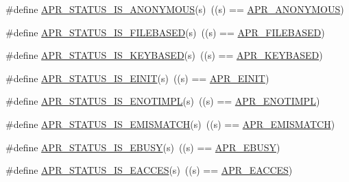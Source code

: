 \begin{DoxyCompactItemize}
\item 
\#define \hyperlink{group___a_p_r___s_t_a_t_u_s___i_s_gabf2969f69ac131cb06178c0809abf943}{A\-P\-R\-\_\-\-S\-T\-A\-T\-U\-S\-\_\-\-I\-S\-\_\-\-A\-N\-O\-N\-Y\-M\-O\-U\-S}(s)~((s) == \hyperlink{group___a_p_r___error_ga738a229b0c27bd96ae0173fecab251b7}{A\-P\-R\-\_\-\-A\-N\-O\-N\-Y\-M\-O\-U\-S})
\item 
\#define \hyperlink{group___a_p_r___s_t_a_t_u_s___i_s_ga7e46240d526e81f5ffbc266ca29b9f6a}{A\-P\-R\-\_\-\-S\-T\-A\-T\-U\-S\-\_\-\-I\-S\-\_\-\-F\-I\-L\-E\-B\-A\-S\-E\-D}(s)~((s) == \hyperlink{group___a_p_r___error_ga28a6d59b62d2698208451a9343399fbb}{A\-P\-R\-\_\-\-F\-I\-L\-E\-B\-A\-S\-E\-D})
\item 
\#define \hyperlink{group___a_p_r___s_t_a_t_u_s___i_s_gaf43f4a40f5ab2fe196acb4e12f20b79e}{A\-P\-R\-\_\-\-S\-T\-A\-T\-U\-S\-\_\-\-I\-S\-\_\-\-K\-E\-Y\-B\-A\-S\-E\-D}(s)~((s) == \hyperlink{group___a_p_r___error_gaac52bebace264494fa94cdf0b4344d26}{A\-P\-R\-\_\-\-K\-E\-Y\-B\-A\-S\-E\-D})
\item 
\#define \hyperlink{group___a_p_r___s_t_a_t_u_s___i_s_gaeaa5fbb21b72fcbbe98b0f100d204048}{A\-P\-R\-\_\-\-S\-T\-A\-T\-U\-S\-\_\-\-I\-S\-\_\-\-E\-I\-N\-I\-T}(s)~((s) == \hyperlink{group___a_p_r___error_gaacd087793c97a3493eafc14075775b82}{A\-P\-R\-\_\-\-E\-I\-N\-I\-T})
\item 
\#define \hyperlink{group___a_p_r___s_t_a_t_u_s___i_s_gacab882e24f5d6491777e8ef7763d02fb}{A\-P\-R\-\_\-\-S\-T\-A\-T\-U\-S\-\_\-\-I\-S\-\_\-\-E\-N\-O\-T\-I\-M\-P\-L}(s)~((s) == \hyperlink{group___a_p_r___error_ga939ddb834a30bc9a5a0a329b13000161}{A\-P\-R\-\_\-\-E\-N\-O\-T\-I\-M\-P\-L})
\item 
\#define \hyperlink{group___a_p_r___s_t_a_t_u_s___i_s_ga7234b0d01a8e3ea8e5345f3f242df030}{A\-P\-R\-\_\-\-S\-T\-A\-T\-U\-S\-\_\-\-I\-S\-\_\-\-E\-M\-I\-S\-M\-A\-T\-C\-H}(s)~((s) == \hyperlink{group___a_p_r___error_ga31e65a44daba96aa6d943529e94498e7}{A\-P\-R\-\_\-\-E\-M\-I\-S\-M\-A\-T\-C\-H})
\item 
\#define \hyperlink{group___a_p_r___s_t_a_t_u_s___i_s_gabb92ad7b6ef304132de70e9e5cbaa896}{A\-P\-R\-\_\-\-S\-T\-A\-T\-U\-S\-\_\-\-I\-S\-\_\-\-E\-B\-U\-S\-Y}(s)~((s) == \hyperlink{group___a_p_r___error_gab6e5bc99dbace4a91d8d0adcbd8fd66b}{A\-P\-R\-\_\-\-E\-B\-U\-S\-Y})
\item 
\#define \hyperlink{group___a_p_r___s_t_a_t_u_s___i_s_ga61e7a9958689dec6da6279f0cb6073ca}{A\-P\-R\-\_\-\-S\-T\-A\-T\-U\-S\-\_\-\-I\-S\-\_\-\-E\-A\-C\-C\-E\-S}(s)~((s) == \hyperlink{group___a_p_r___error_ga407fc0ea7ead60f7a97fb9d70061bd41}{A\-P\-R\-\_\-\-E\-A\-C\-C\-E\-S})

\end{DoxyCompactItemize}
